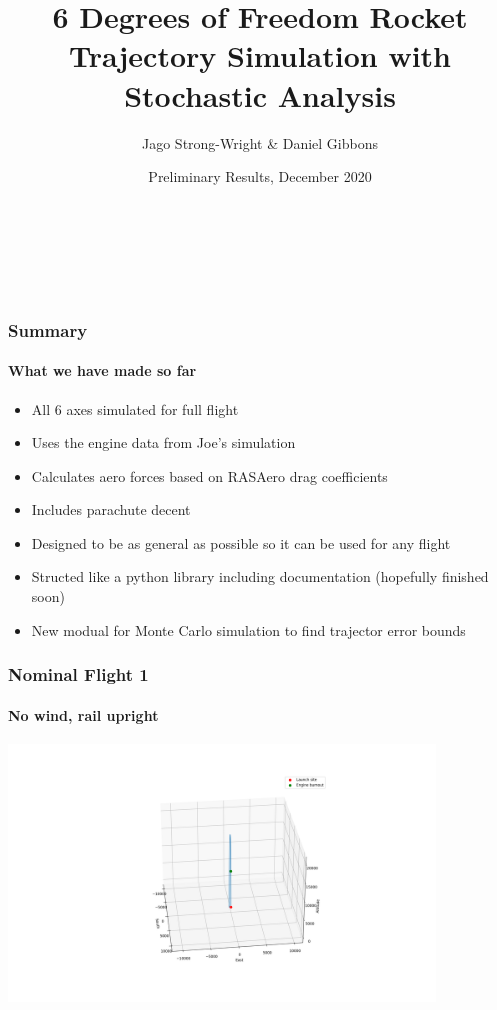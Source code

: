 \documentclass{beamer}
\title[6DOF Trajectory Simulation: Preliminary Results]{6 Degrees of Freedom Rocket Trajectory Simulation with Stochastic Analysis} %
\author%
{Jago Strong-Wright \& Daniel Gibbons
}
\institute%
{%
    \textit{}\\
    \textit{}
}
\date[Dec 2020]{Preliminary Results, December 2020} %
\begin{document}
    \begin{frame}
        \begin{titlepage}
                {\inserttitle\\[0.9cm]}
                {\insertauthor\par}
                {\insertinstitute\\[0.3cm]}
                {\insertdate}
        \end{titlepage}
    \end{frame}
    \begin{frame}
        \frametitle{Summary}
        \framesubtitle{What we have made so far}

        \begin{itemize}
            \item All 6 axes simulated for full flight
            \item Uses the engine data from Joe's simulation 
            \item Calculates aero forces based on RASAero drag coefficients
            \item Includes parachute decent
            \item Designed to be as general as possible so it can be used for any flight
            \item Structed like a python library including documentation (hopefully finished soon)
            \item New modual for Monte Carlo simulation to find trajector error bounds
        \end{itemize} 

    \end{frame}
    \begin{frame}
        \frametitle{Nominal Flight 1}
        \framesubtitle{No wind, rail upright}
        \includegraphics[width=0.85\textwidth]{images/example1.png}
    \end{frame}
\end{document}
